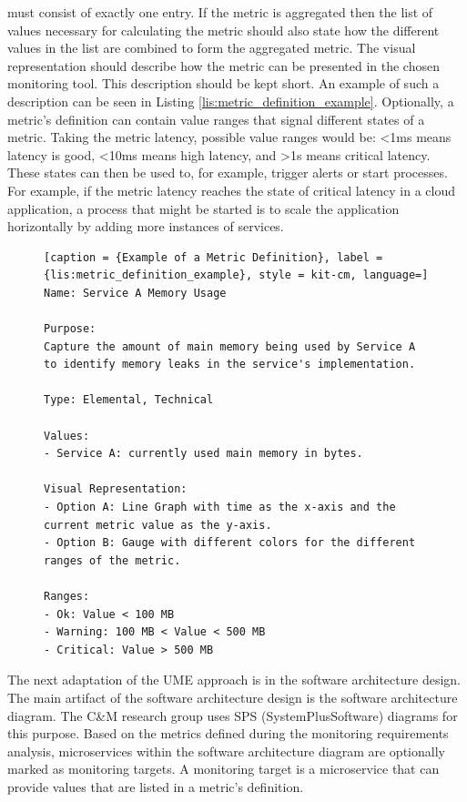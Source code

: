 must consist of exactly one entry. If the metric is aggregated then the list of values necessary for calculating
the metric should also state how the different values in the list are combined to form the aggregated metric.
The visual representation should describe how the metric can be presented in the chosen monitoring tool.
This description should be kept short. An example of such a description can be seen in Listing \ref{lis:metric_definition_example}.
Optionally, a metric's definition can contain value ranges that signal different states of a metric.
Taking the metric latency, possible value ranges would be: <1ms means latency is good, <10ms means high latency,
and >1s means critical latency. These states can then be used to, for example, trigger alerts or start
processes. For example, if the metric latency reaches the state of critical latency in a cloud application,
a process that might be started is to scale the application horizontally by adding more instances of services.

\begin{figure}[tb]
\begin{lstlisting}[caption = {Example of a Metric Definition}, label = {lis:metric_definition_example}, style = kit-cm, language=]
Name: Service A Memory Usage

Purpose:
Capture the amount of main memory being used by Service A
to identify memory leaks in the service's implementation.

Type: Elemental, Technical

Values:
- Service A: currently used main memory in bytes.

Visual Representation:
- Option A: Line Graph with time as the x-axis and the current metric value as the y-axis.
- Option B: Gauge with different colors for the different ranges of the metric.

Ranges:
- Ok: Value < 100 MB
- Warning: 100 MB < Value < 500 MB
- Critical: Value > 500 MB
\end{lstlisting}
\end{figure}

The next adaptation of the UME approach is in the software architecture design.
The main artifact of the software architecture design is the software architecture diagram.
The C\&M research group uses SPS (SystemPlusSoftware) diagrams for this purpose.
Based on the metrics defined during the monitoring requirements analysis,
microservices within the software architecture diagram are optionally marked as monitoring targets.
A monitoring target is a microservice that can provide values that are listed in a metric's definition.

